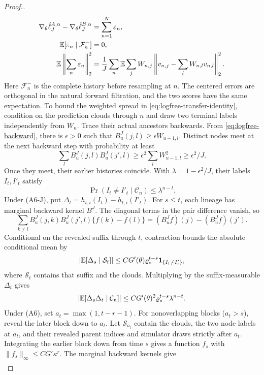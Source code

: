 \documentclass[11pt]{article}
\theoremstyle{thmstylethree}%
\begin{document}
\begin{proof}[Proof.]
{\begin{align}
\nabla_\theta\hat\ell_J^{A,\alpha}-\nabla_\theta\hat\ell_J^{B,\alpha}
&=\sum_{n=1}^N\varepsilon_n,\notag\\
\mathbb{E}[\varepsilon_n\mid\mathcal F_n^-]&=0,\notag\\
\mathbb{E}\left\|\sum_n\varepsilon_n\right\|_2^2
&=\frac1J\sum_n\mathbb{E}\sum_jW_{n,j}
 \left\|v_{n,j}-\sum_lW_{n,l}v_{n,l}\right\|_2^2.
\label{eq:logfree-transfer-identity}
\end{align}
Here $\mathcal F_n^-$ is the complete history before resampling at $n$.
The centered errors are orthogonal in the natural forward filtration,
and the two scores have the same expectation.
\endgraf
To bound the weighted spread in \eqref{eq:logfree-transfer-identity}, condition
on the prediction clouds through $n$ and draw two terminal labels
independently from $W_n$. Trace their actual ancestors backwards. From
\eqref{eq:logfree-backward}, there is $\epsilon>0$ such that
$B_u^J(j,l)\geq\epsilon W_{u-1,l}$. Distinct nodes meet at the next
backward step with probability at least
\[
\sum_l B_u^J(j,l)B_u^J(j',l)
\geq\epsilon^2\sum_lW_{u-1,l}^2\geq\epsilon^2/J.
\]
Once they meet, their earlier histories coincide. With
$\lambda=1-\epsilon^2/J$, their labels $I_t,I'_t$ satisfy
\[
\Pr(I_t\ne I'_t\mid\mathcal C_n)\leq\lambda^{n-t}.
\]
Under (A6-J), put $\Delta_t=h_{t,i}(I_t)-h_{t,i}(I'_t)$.
For $s\leq t$, each lineage has marginal backward kernel $B^J$.
The diagonal terms in the pair difference vanish, so
\[
\sum_{k\ne l}B_u^J(j,k)B_u^J(j',l)\{f(k)-f(l)\}
=(B_u^Jf)(j)-(B_u^Jf)(j').
\]
Conditional on the revealed suffix through $t$, contraction bounds
the absolute conditional mean by
\[
\left|\mathbb{E}[\Delta_s\mid\mathcal S_t]\right|
\leq CG'(\theta)\varrho_*^{t-s}\mathbf1_{\{I_t\ne I'_t\}},
\]
where $\mathcal S_t$ contains that suffix and the clouds.
Multiplying by the suffix-measurable $\Delta_t$ gives
\begin{equation}
|\mathbb{E}[\Delta_s\Delta_t\mid\mathcal C_n]|
\leq CG'(\theta)^2\varrho_*^{t-s}\lambda^{n-t}.
\label{eq:logfree-pair}
\end{equation}
\endgraf
Under (A6), set $a_t=\max(1,t-r-1)$. For nonoverlapping blocks
($a_t>s$), reveal the later block down to $a_t$.
Let $\mathcal S_{a_t}$ contain the clouds, the two node labels at $a_t$,
and their revealed parent indices and simulator draws strictly after
$a_t$. Integrating the earlier block down from time
$s$ gives a function $f_s$ with $\|f_s\|_\infty\leq CG'\kappa^r$.
The marginal backward kernels give
\begin{align*}

\end{align*}}
\end{proof}
\end{document}
